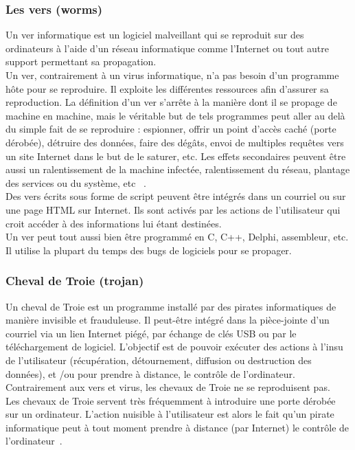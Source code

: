 \subsubsection{Les vers (worms)}
Un ver informatique est un logiciel malveillant qui se reproduit sur des ordinateurs à l'aide
d'un réseau informatique comme l'Internet ou tout autre support permettant sa propagation.\\
Un ver, contrairement à un virus informatique, n'a pas besoin d'un programme hôte pour se
reproduire. Il exploite les différentes ressources afin d'assurer sa reproduction. La définition d'un ver s'arrête à la manière dont il se propage de machine en machine, mais le véritable but de tels programmes peut aller au delà du simple fait de se reproduire : espionner, offrir un point d'accès caché (porte dérobée), détruire des données, faire des dégâts, envoi de multiples requêtes vers un site Internet dans le but de le saturer, etc. Les effets secondaires peuvent être aussi un ralentissement de la machine infectée, ralentissement du réseau, plantage des services ou du système, etc ~\cite{ver}.\\

Des vers écrits sous forme de script peuvent être intégrés dans un courriel ou sur une page
HTML sur Internet. Ils sont activés par les actions de l'utilisateur qui croit accéder à des
informations lui étant destinées.\\
Un ver peut tout aussi bien être programmé en C, C++, Delphi, assembleur, etc. Il utilise la
plupart du temps des bugs de logiciels pour se propager.


\subsubsection{Cheval de Troie (trojan)}
Un cheval de Troie est un programme installé par des pirates informatiques de manière invisible et frauduleuse. Il peut-être intégré dans la pièce-jointe d’un courriel via un lien Internet piégé, par échange de clés USB ou par le téléchargement de logiciel. L’objectif est de pouvoir exécuter des actions à l'insu de l'utilisateur (récupération, détournement, diffusion ou destruction des données), et /ou pour prendre à distance, le contrôle de l'ordinateur. Contrairement aux vers et virus, les chevaux de Troie ne se reproduisent pas. \\

Les chevaux de Troie servent très fréquemment à introduire une porte dérobée sur un
ordinateur. L'action nuisible à l'utilisateur est alors le fait qu'un pirate informatique peut à tout moment prendre à distance (par Internet) le contrôle de l'ordinateur~\cite{troj}.
